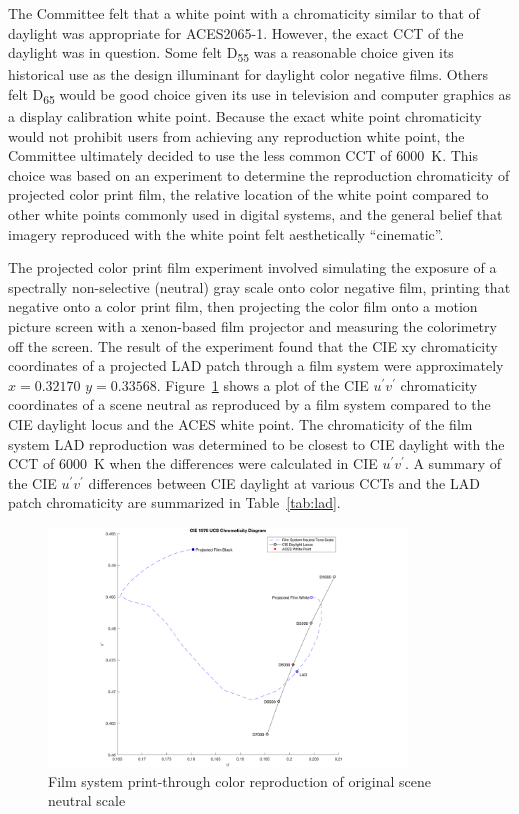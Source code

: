 The Committee felt that a white point with a chromaticity similar to that of daylight was appropriate for ACES2065-1.  However, the exact CCT of the daylight was in question.  Some felt D\textsubscript{55} was a reasonable choice given its historical use as the design illuminant for daylight color negative films.  Others felt D\textsubscript{65} would be good choice given its use in television and computer graphics as a display calibration white point.  Because the exact white point chromaticity would not prohibit users from achieving any reproduction white point, the Committee ultimately decided to use the less common CCT of \SI[mode=text]{6000}{\kelvin}.  This choice was based on an experiment to determine the reproduction chromaticity of projected color print film, the relative location of the white point compared to other white points commonly used in digital systems, and the general belief that imagery reproduced with the white point felt aesthetically ``cinematic''.

The projected color print film experiment involved simulating the exposure of a spectrally non-selective (neutral) gray scale onto color negative film, printing that negative onto a color print film, then projecting the color film onto a motion picture screen with a xenon-based film projector and measuring the colorimetry off the screen. The result of the experiment found that the CIE xy chromaticity coordinates of a projected LAD patch \cite{pytlak1976simplified,kodakLad} through a film system were approximately $x=0.32170$ $y=0.33568$. Figure~\ref{fig:filmprintthrough} shows a plot of the CIE $u^\prime v^\prime$ chromaticity coordinates of a scene neutral as reproduced by a film system compared to the CIE daylight locus and the ACES white point.  The chromaticity of the film system LAD reproduction was determined to be closest to CIE daylight with the CCT of \SI[mode=text]{6000}{\kelvin} when the differences were calculated in CIE $u^\prime v^\prime$.  A summary of the CIE $u^\prime v^\prime$ differences between CIE daylight at various CCTs and the LAD patch chromaticity are summarized in Table~\ref{tab:lad}.

\begin{figure}[!ht]
    \centering
    \includegraphics[width=0.85\textwidth]{images/PrintThroughChromaticities.png}
    \caption{Film system print-through color reproduction of original scene neutral scale}
    \label{fig:filmprintthrough}
\end{figure}

